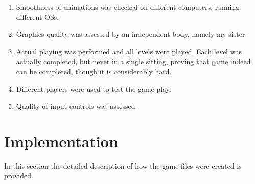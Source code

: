 \documentclass[11pt,a4paper]{report}
\begin{document}
				\begin{enumerate}
					\item
						Smoothness of animations was checked on different computers, running different OSs.
					\item
						Graphics quality was assessed by an independent body, namely my sister.
					\item
						Actual playing was performed and all levels were played. Each level was actually completed, but never in a single sitting, proving that game indeed can be completed, though it is considerably hard.
					\item
						Different players were used to test the game play.
					\item
						Quality of input controls was assessed.
				\end{enumerate}
	\chapter{Implementation}
		In this section the detailed description of how the game files were created is provided.
\end{document}
